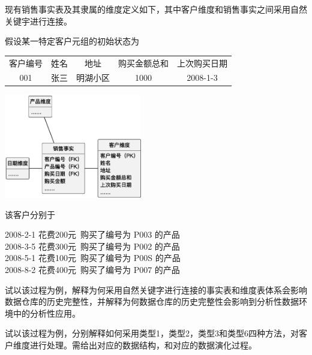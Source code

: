 \begin{problem}
现有销售事实表及其隶属的维度定义如下，其中客户维度和销售事实之间采用自然关键宇进行连接。

假设某一特定客户元组的初始状态为
\begin{table}[H]
    \centering
    \vspace{-0.5em}
    {\kaishu \begin{tabular}{ccccc}
    客户编号 & 姓名 & 地址   & 购买金额总和 & 上次购买日期   \\
    001  & 张三 & 明湖小区 & 1000   & 2008-1-3
    \end{tabular}}
    \vspace{-1.5em}
\end{table}

\begin{table}
    \centering
    \vspace{-1.5em}
    \includegraphics[width=6cm]{images/销售事实表及其隶属的维度定义.eps}
\end{table}

该客户分别于
\vspace{-0.7em}
\begin{center}
2008-2-1 花费200元\ 购买了编号为 P003 的产品\\
2008-3-5 花费300元\ 购买了编号为 P002 的产品\\
2008-5-1 花费100元\ 购买了编号为 P00S 的产品\\
2008-8-2 花费400元\ 购买了编号为 P007 的产品\\
\end{center}
\vspace{-0.7em}
 试以该过程为例，解释为何采用自然关键字进行连接的事实表和维度表体系会影响数据仓库的历史完整性，并解释为何数据仓库的历史完整性会影响到分析性数据环境中的分析性应用。

 试以该过程为例，分别解释如何采用类型1，类型2，类型3和类型6四种方法，对客户维度进行处理。需给出对应的数据结构，和对应的数据演化过程。

\end{problem}

\begin{solution}

\end{solution}

